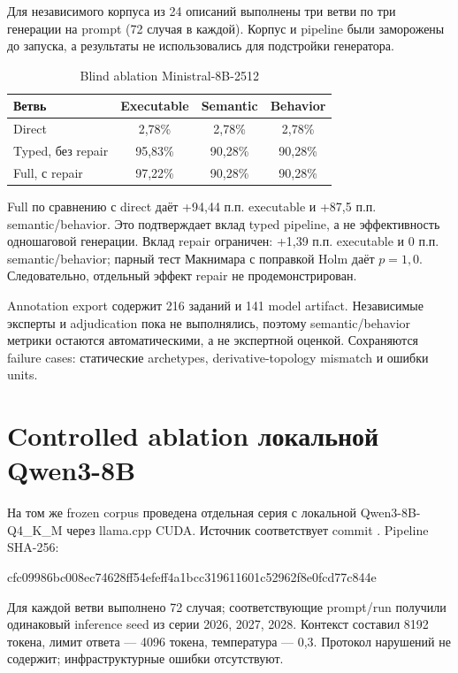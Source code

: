 Для независимого корпуса из 24 описаний выполнены три ветви по три генерации на prompt (72 случая в каждой). Корпус и pipeline были заморожены до запуска, а результаты не использовались для подстройки генератора.

\begin{table}[H]
    \centering
    \caption{Blind ablation Ministral-8B-2512}
    \label{tab:ministral-ablation}
    \small
    \begin{tabular}{lccc}
        \toprule
        Ветвь & Executable & Semantic & Behavior \\
        \midrule
        Direct & 2,78\% & 2,78\% & 2,78\% \\
        Typed, без repair & 95,83\% & 90,28\% & 90,28\% \\
        Full, с repair & 97,22\% & 90,28\% & 90,28\% \\
        \bottomrule
    \end{tabular}
\end{table}

Full по сравнению с direct даёт +94,44 п.п. executable и +87,5 п.п. semantic/behavior. Это подтверждает вклад typed pipeline, а не эффективность одношаговой генерации. Вклад repair ограничен: +1,39 п.п. executable и 0 п.п. semantic/behavior; парный тест Макнимара с поправкой Holm даёт $p=1,0$. Следовательно, отдельный эффект repair не продемонстрирован.

Annotation export содержит 216 заданий и 141 model artifact. Независимые эксперты и adjudication пока не выполнялись, поэтому semantic/behavior метрики остаются автоматическими, а не экспертной оценкой. Сохраняются failure cases: статические archetypes, derivative-topology mismatch и ошибки units.

\section{Controlled ablation локальной Qwen3-8B}

На том же frozen corpus проведена отдельная серия с локальной Qwen3-8B-Q4\_K\_M через llama.cpp CUDA. Источник соответствует commit . Pipeline SHA-256:
\begin{center}
\scriptsize\ttfamily cfc09986bc008ec74628ff54efeff4a1bcc319611601c52962f8e0fcd77c844e
\end{center}
Для каждой ветви выполнено 72 случая; соответствующие prompt/run получили одинаковый inference seed из серии 2026, 2027, 2028. Контекст составил 8192 токена, лимит ответа --- 4096 токена, температура --- 0,3. Протокол нарушений не содержит; инфраструктурные ошибки отсутствуют.

